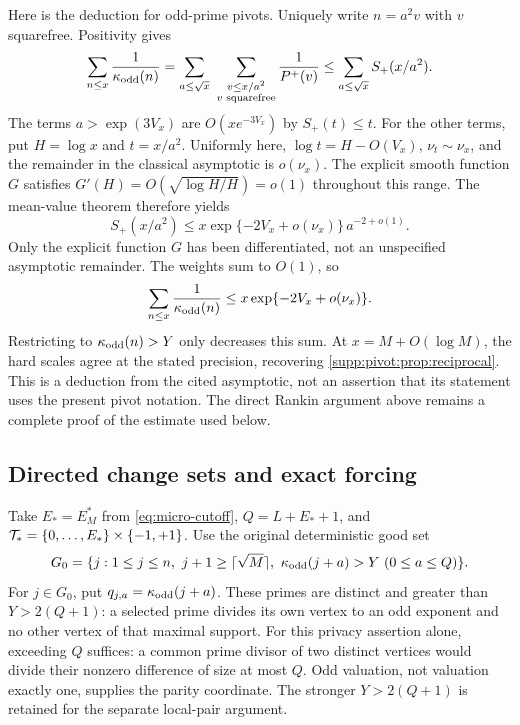 Here is the deduction for odd-prime pivots. Uniquely write $n=a^2v$
with $v$ squarefree. Positivity gives
\[
 \sum_{n\le x}\frac1{\kappa_{\rm odd}(n)}
 =\sum_{a\le\sqrt x}\ \sum_{\substack{v\le x/a^2\\v\text{ squarefree}}}
                           \frac1{P^+(v)}
 \le\sum_{a\le\sqrt x} S_+(x/a^2).
\]
The terms $a>\exp(3V_x)$ are $O(xe^{-3V_x})$ by $S_+(t)\le t$.
For the other terms, put $H=\log x$ and $t=x/a^2$. Uniformly here,
$\log t=H-O(V_x)$, $\nu_t\sim\nu_x$, and the remainder in the
classical asymptotic is $o(\nu_x)$. The explicit smooth function $G$
satisfies $G'(H)=O(\sqrt{\log H/H})=o(1)$ throughout this range.
The mean-value theorem therefore yields
\[
 S_+(x/a^2)
 \le x\exp\{-2V_x+o(\nu_x)\}\,a^{-2+o(1)}.
\]
Only the explicit function $G$ has been differentiated, not an
unspecified asymptotic remainder. The weights sum to $O(1)$, so
\[
 \sum_{n\le x}\frac1{\kappa_{\rm odd}(n)}
       \le x\exp\{-2V_x+o(\nu_x)\}.
\]
Restricting to $\kappa_{\rm odd}(n)>Y$ only decreases this sum.
At $x=M+O(\log M)$, the hard scales agree at the stated precision,
recovering \cref{supp:pivot:prop:reciprocal}.
This is a deduction from the cited asymptotic, not an assertion that
its statement uses the present pivot notation. The direct Rankin
argument above remains a complete proof of the estimate used below.

\subsection{Directed change sets and exact forcing}\label{supp:pivot:sec:forcing}
Take $E_*=E_M^*$ from \eqref{eq:micro-cutoff}, $Q=L+E_*+1$, and
$\mathcal T_* =\{0,\ldots,E_*\}\times\{-1,+1\}$.
Use the original deterministic good set
\begin{equation}\label{supp:pivot:eq:good}
 G_0=\{j:1\le j\le n,\ j+1\ge\lceil\sqrt M\rceil,
                    \ \kappa_{\rm odd}(j+a)>Y\ (0\le a\le Q)\}.
\end{equation}
For $j\in G_0$, put $q_{j,a}=\kappa_{\rm odd}(j+a)$.
These primes are distinct and greater than $Y>2(Q+1)$: a selected prime divides its own vertex to an odd exponent and no other vertex of that maximal support.
For this privacy assertion alone, exceeding $Q$ suffices: a common
prime divisor of two distinct vertices would divide their nonzero
difference of size at most $Q$. Odd valuation, not valuation exactly
one, supplies the parity coordinate. The stronger $Y>2(Q+1)$ is
retained for the separate local-pair argument.

